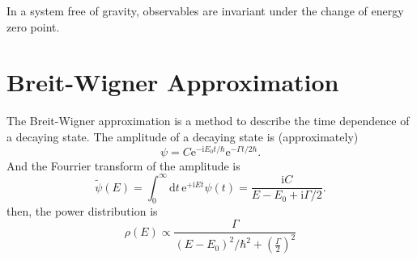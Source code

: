 In a system free of gravity, observables are invariant under the change of energy zero point.

\section[Breit-Wigner 近似]{Breit-Wigner Approximation}
The Breit-Wigner approximation is a method to describe the time dependence of a decaying state. The amplitude of a decaying state is (approximately) 
\begin{equation}
  \psi = C \mathrm{e}^{- \mathrm{i} E_0 t / \hbar} \mathrm{e}^{- \Gamma t / 2 \hbar}.
\end{equation}
And the Fourrier transform of the amplitude is
\begin{equation}
  \tilde{\psi} \left( E \right) = \int_{0}^{\infty} \mathrm{d}t \,  \mathrm{e}^{+ \mathrm{i}  Et} \psi\left( t \right) = \frac{\mathrm{i} C}{E - E_0 + \mathrm{i} \Gamma / 2}.
\end{equation}
then, the power distribution is
\begin{equation}
  \rho \left( E \right) \propto \frac{\Gamma}{\left( E - E_0 \right) ^{2} / \hbar ^{2} + \left( \frac{\Gamma}{2} \right) ^{2}}
\end{equation}